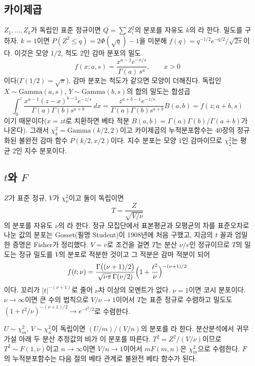 \subsection{카이제곱}

$Z_1,\dots,Z_k$가 독립인 표준 정규이면 $Q=\sum Z_i^2$의 분포를 자유도 $k$의 라 한다. 밀도를 구하자. $k=1$이면 $P(Z^2\le q)=2\Phi(\sqrt q)-1$을 미분해 $f(q)=q^{-1/2}e^{-q/2}/\sqrt{2\pi}$이다. 이것은 모양 $1/2$, 척도 $2$인 감마 분포의 밀도
\[
f(x;a,s)=\frac{x^{a-1}e^{-x/s}}{\Gamma(a)\,s^a},\qquad x>0
\]
이다($\Gamma(1/2)=\sqrt\pi$). 감마 분포는 척도가 같으면 모양이 더해진다. 독립인 $X\sim\mathrm{Gamma}(a,s)$, $Y\sim\mathrm{Gamma}(b,s)$의 합의 밀도는 합성곱
\[
\int_0^z\frac{x^{a-1}(z-x)^{b-1}e^{-z/s}}{\Gamma(a)\Gamma(b)s^{a+b}}\,dx=\frac{z^{a+b-1}e^{-z/s}}{\Gamma(a)\Gamma(b)s^{a+b}}B(a,b)=f(z;a+b,s)
\]
이기 때문이다($x=zt$로 치환하면 베타 적분 $B(a,b)=\Gamma(a)\Gamma(b)/\Gamma(a+b)$가 나온다). 그래서 $\chi^2_k=\mathrm{Gamma}(k/2,2)$이고 카이제곱의 누적분포함수는 40장의 정규화된 불완전 감마 함수 $P(k/2,x/2)$이다. 지수 분포는 모양 $1$인 감마이므로 $\chi^2_2$는 평균 $2$인 지수 분포이다.

\subsection{$t$와 $F$}

$Z$가 표준 정규, $V$가 $\chi^2_\nu$이고 둘이 독립이면
\[
T=\frac Z{\sqrt{V/\nu}}
\]
의 분포를 자유도 $\nu$의 라 한다. 정규 모집단에서 표본평균과 모평균의 차를 표준오차로 나눈 값의 분포는 Gosset(필명 Student)이 1908년에 처음 구했고\cite{student1908}, 지금의 $t$ 꼴과 엄밀한 증명은 Fisher가 정리했다. $V=v$로 조건을 걸면 $T$는 분산 $\nu/v$인 정규이므로 $T$의 밀도는 정규 밀도를 $V$의 분포로 적분한 것이고 그 적분은 감마 적분이 되어
\[
f(t;\nu)=\frac{\Gamma\bigl((\nu+1)/2\bigr)}{\sqrt{\nu\pi}\,\Gamma(\nu/2)}\Bigl(1+\frac{t^2}\nu\Bigr)^{-(\nu+1)/2}
\]
이다. 꼬리가 $|t|^{-(\nu+1)}$로 줄어 $\nu$차 이상의 모멘트가 없다. $\nu=1$이면 코시 분포이다. $\nu\to\infty$이면 큰 수의 법칙으로 $V/\nu\to1$이어서 $T$는 표준 정규로 수렴하고 밀도도 $(1+t^2/\nu)^{-(\nu+1)/2}\to e^{-t^2/2}$로 수렴한다.

$U\sim\chi^2_m$, $V\sim\chi^2_n$이 독립이면 $(U/m)/(V/n)$의 분포를 라 한다. 분산분석에서 귀무가설 아래 두 분산 추정값의 비가 이 분포를 따른다. $T^2=Z^2/(V/\nu)$이므로 $T^2\sim F(1,\nu)$이고 $n\to\infty$이면 $V/n\to1$이어서 $mF(m,n)$은 $\chi^2_m$으로 수렴한다. $F$의 누적분포함수는 다음 절의 베타 관계로 불완전 베타 함수가 된다.

